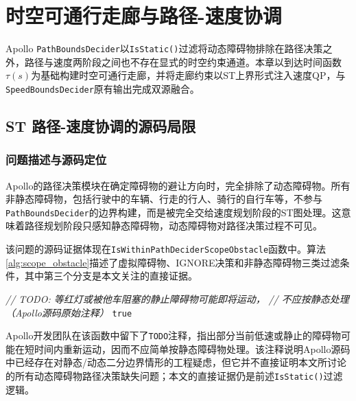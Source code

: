\chapter{时空可通行走廊与路径-速度协调}
\label{chap:st_corridor}

Apollo \texttt{PathBoundsDecider}以\texttt{IsStatic()}过滤将动态障碍物排除在路径决策之外，路径与速度两阶段之间也不存在显式的时空约束通道。本章以到达时间函数$\tau(s)$为基础构建时空可通行走廊，并将走廊约束以ST上界形式注入速度QP，与\texttt{SpeedBoundsDecider}原有输出完成双源融合。

\section{ST 路径-速度协调的源码局限}
\label{sec:problem_st}

\subsection{问题描述与源码定位}

Apollo的路径决策模块在确定障碍物的避让方向时，完全排除了动态障碍物。所有非静态障碍物，包括行驶中的车辆、行走的行人、骑行的自行车等，不参与\texttt{PathBoundsDecider}的边界构建，而是被完全交给速度规划阶段的ST图处理。这意味着路径规划阶段只感知静态障碍物，动态障碍物对路径决策过程不可见。

该问题的源码证据体现在\texttt{IsWithinPathDecider\-ScopeObstacle}函数中。算法\ref{alg:scope_obstacle}描述了虚拟障碍物、IGNORE决策和非静态障碍物三类过滤条件，其中第三个分支是本文关注的直接证据。

\begin{algorithm}[htbp]
\caption{动态障碍物被路径决策排除}
\label{alg:scope_obstacle}
\textcolor{gray!30!black}{\textit{// TODO: 等红灯或被他车阻塞的静止障碍物可能即将运动，}}\;
\textcolor{gray!30!black}{\textit{// 不应按静态处理（Apollo源码原始注释）}}\;
\KwRet \texttt{true} \;
\end{algorithm}

Apollo开发团队在该函数中留下了\texttt{TODO}注释，指出部分当前低速或静止的障碍物可能在短时间内重新运动，因而不应简单按静态障碍物处理。该注释说明Apollo源码中已经存在对静态/动态二分边界情形的工程疑虑，但它并不直接证明本文所讨论的所有动态障碍物路径决策缺失问题；本文的直接证据仍是前述\texttt{IsStatic()}过滤逻辑。

